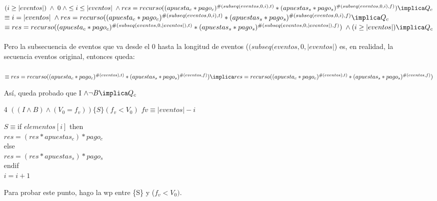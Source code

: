 \documentclass[10pt,a4paper]{article}
\begin{document}
\begin{itemize}[leftmargin=*]
$(i \geq |eventos|) \phantom{.} \wedge \phantom{.} 0 \phantom{.} \wedge \leq i \leq |eventos| \phantom{.} \wedge \\ res = recurso((apuesta_c * pago_c)^{\#(subseq(eventos,0,i), t)} * (apuestas_s * pago_s)^{\#(subseq(eventos,0,i), f)}) \implica Q_c$
\vspace{0.3cm}\\
$\equiv i = |eventos| \phantom{.} \wedge \\ res = recurso((apuesta_c * pago_c)^{\#(subseq(eventos,0,i), t)} * (apuestas_s * pago_s)^{\#(subseq(eventos,0,i), f)} \implica Q_c$
\vspace{0.3cm}\\
$\equiv res = recurso((apuesta_c * pago_c)^{\#(subseq(eventos,0,|eventos|), t)} * (apuestas_s * pago_s)^{\#(subseq(eventos,0,|eventos|), f)}) \phantom{.} \wedge \\ (i \geq |eventos|) \implica Q_c$\\
\\Pero la subsecuencia de eventos que va desde el 0 hasta la longitud de eventos ($(subseq(eventos,0,|eventos|$) es, en realidad, la secuencia eventos original, entonces queda:\\
\\
$\equiv res = recurso((apuesta_c * pago_c)^{\#(eventos), t)} * (apuestas_s * pago_s)^{\#(eventos, f)})\\ \implica res = recurso((apuesta_c * pago_c)^{\#(eventos), t)} * (apuestas_s * pago_s)^{\#(eventos, f)})$

Así, queda probado que I $\wedge \neg B \implica Q_c$

    \item[4]$((I \wedge B) \wedge (V_0 = f_{v}))\{S\} (f_v < V_0)$
\vspace{0.3cm}
${fv \equiv |eventos| - i}$

$S \equiv $\phantom{.}if $elementos[i]$ then\\
\tab \tab$res = (res * apuestas_c)*pago_c$\\
\tab else\\
\tab \tab$res = (res * apuestas_s)*pago_s$\\
\tab endif\\
$i = i+1$

Para probar este punto, hago la wp entre \{S\} y ($f_v<V_0)$.


\end{itemize}
\end{document}
